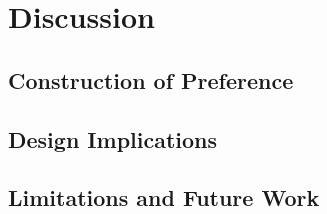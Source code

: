 \section{Discussion}

\subsection{Construction of Preference}

\subsection{Design Implications}

\subsection{Limitations and Future Work}
